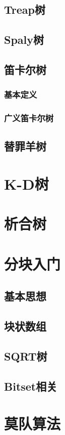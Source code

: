 \documentclass[12pt,a4paper]{article}
\begin{document}
\subsection{Treap树}
\subsection{Spaly树}
\subsection{笛卡尔树}
\subsubsection{基本定义}
\subsubsection{广义笛卡尔树}
\subsection{替罪羊树}

\newpage
\section{K-D树}

\newpage
\section{析合树}

\newpage
\section{分块入门}
\subsection{基本思想}
\subsection{块状数组} %
\subsection{SQRT树}
\subsection{Bitset相关}

\newpage
\section{莫队算法}
\end{document}
